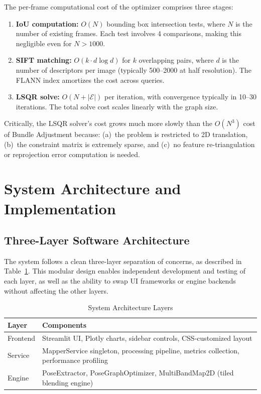 \documentclass[conference]{IEEEtran}
\begin{document}
The per-frame computational cost of the optimizer comprises three stages:

\begin{enumerate}
    \item \textbf{IoU computation:} $O(N)$ bounding box intersection tests, where $N$ is the number of existing frames. Each test involves 4 comparisons, making this negligible even for $N > 1000$.
    \item \textbf{SIFT matching:} $O(k \cdot d \log d)$ for $k$ overlapping pairs, where $d$ is the number of descriptors per image (typically 500--2000 at half resolution). The FLANN index amortizes the cost across queries.
    \item \textbf{LSQR solve:} $O(N + |\mathcal{E}|)$ per iteration, with convergence typically in 10--30 iterations. The total solve cost scales linearly with the graph size.
\end{enumerate}

Critically, the LSQR solver's cost grows much more slowly than the $O(N^3)$ cost of Bundle Adjustment because: (a)~the problem is restricted to 2D translation, (b)~the constraint matrix is extremely sparse, and (c)~no feature re-triangulation or reprojection error computation is needed.


\section{System Architecture and Implementation}
\label{sec:system}

\subsection{Three-Layer Software Architecture}

The system follows a clean three-layer separation of concerns, as described in Table~\ref{tab:arch_layers}. This modular design enables independent development and testing of each layer, as well as the ability to swap UI frameworks or engine backends without affecting the other layers.

\begin{table}[h]
\centering
\caption{System Architecture Layers}
\label{tab:arch_layers}
\begin{tabular}{lp{5.5cm}}
\toprule
\textbf{Layer} & \textbf{Components} \\
\midrule
Frontend & Streamlit UI, Plotly charts, sidebar controls, CSS-customized layout \\
Service & MapperService singleton, processing pipeline, metrics collection, performance profiling \\
Engine & PoseExtractor, PoseGraphOptimizer, MultiBandMap2D (tiled blending engine) \\
\bottomrule
\end{tabular}
\end{table}
\end{document}
